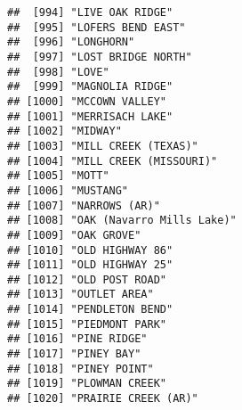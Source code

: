 \documentclass[
]{article}
\begin{document}
\begin{verbatim}
##  [994] "LIVE OAK RIDGE"                                                                      
##  [995] "LOFERS BEND EAST"                                                                    
##  [996] "LONGHORN"                                                                            
##  [997] "LOST BRIDGE NORTH"                                                                   
##  [998] "LOVE"                                                                                
##  [999] "MAGNOLIA RIDGE"                                                                      
## [1000] "MCCOWN VALLEY"                                                                       
## [1001] "MERRISACH LAKE"                                                                      
## [1002] "MIDWAY"                                                                              
## [1003] "MILL CREEK (TEXAS)"                                                                  
## [1004] "MILL CREEK (MISSOURI)"                                                               
## [1005] "MOTT"                                                                                
## [1006] "MUSTANG"                                                                             
## [1007] "NARROWS (AR)"                                                                        
## [1008] "OAK (Navarro Mills Lake)"                                                            
## [1009] "OAK GROVE"                                                                           
## [1010] "OLD HIGHWAY 86"                                                                      
## [1011] "OLD HIGHWAY 25"                                                                      
## [1012] "OLD POST ROAD"                                                                       
## [1013] "OUTLET AREA"                                                                         
## [1014] "PENDLETON BEND"                                                                      
## [1015] "PIEDMONT PARK"                                                                       
## [1016] "PINE RIDGE"                                                                          
## [1017] "PINEY BAY"                                                                           
## [1018] "PINEY POINT"                                                                         
## [1019] "PLOWMAN CREEK"                                                                       
## [1020] "PRAIRIE CREEK (AR)"                                                                  

\end{verbatim}
\end{document}

